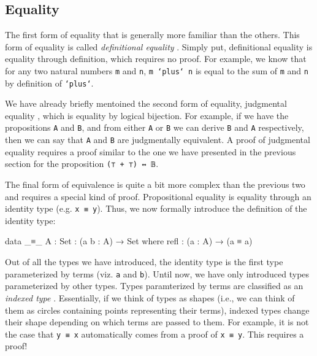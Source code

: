 \documentclass[12pt]{article}
\begin{document}
\subsection*{Equality}
The first form of equality that is generally more familiar than the others.
This form of equality is called {\it definitional equality} \cite{}. Simply put,
definitional equality is equality through definition, which requires no proof.
For example, we know that for any two natural numbers {\tt m} and {\tt n},
{\tt m `plus` n} is equal to the sum of {\tt m} and {\tt n} by definition of
{\tt `plus`}.

We have already briefly mentoined the second form of equality, judgmental
equality \cite{}, which is equality by logical bijection. For example, if we
have the propositions {\tt A} and {\tt B}, and from either {\tt A} or {\tt B} we
can derive {\tt B} and {\tt A} respectively, then we can say that {\tt A} and
{\tt B} are judgmentally equivalent. A proof of judgmental equality requires a
proof similar to the one we have presented in the previous section for the
proposition {\tt (⊤ + ⊤) ↔ 𝔹}.

The final form of equivalence is quite a bit more complex than the previous two
and requires a special kind of proof. Propositional equality is equality through
an identity type (e.g. {\tt x ≡ y}). Thus, we now formally introduce the
definition of the identity type:
\begin{center}
\begin{minipage}{0.9\textwidth}
\begin{code}
data _≡_ {A : Set} : (a b : A) → Set where
  refl : (a : A) → (a ≡ a)
\end{code}
\end{minipage}
\end{center}
Out of all the types we have introduced, the identity type is the first type
parameterized by terms (viz. {\tt a} and {\tt b}). Until now, we have only
introduced types parameterized by other types. Types paramterized by terms are
classified as an {\em indexed type} \cite{}. Essentially, if we think of types
as shapes (i.e., we can think of them as circles containing points representing
their terms), indexed types change their shape depending on which terms are
passed to them. For example, it is not the case that {\tt y ≡ x} automatically
comes from a proof of {\tt x ≡ y}. This requires a proof!
\end{document}
